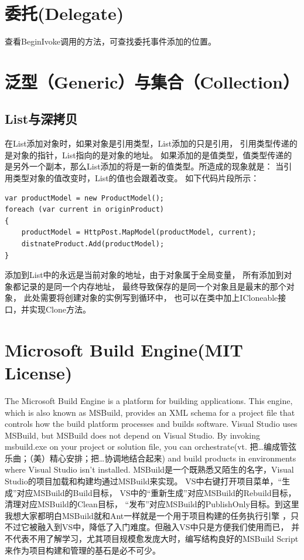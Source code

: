 \documentclass{book}
\begin{document}
\section{委托(Delegate)}

查看BeginIvoke调用的方法，可查找委托事件添加的位置。

\section{泛型（Generic）与集合（Collection）}

\subsection{List与深拷贝}

在List添加对象时，如果对象是引用类型，List添加的只是引用，
引用类型传递的是对象的指针，List指向的是对象的地址。
如果添加的是值类型，值类型传递的是另外一个副本，那么List添加的将是一新的值类型。所造成的现象就是：
当引用类型对象的值改变时，List的值也会跟着改变。
如下代码片段所示：

\begin{lstlisting}[language={[Sharp]C},caption=List添加对象引用示例]
var productModel = new ProductModel();
foreach (var current in originProduct)
{    
    productModel = HttpPost.MapModel(productModel, current);
    distnateProduct.Add(productModel);
}
\end{lstlisting}

添加到List中的永远是当前对象的地址，由于对象属于全局变量，
所有添加到对象都记录的是同一个内存地址，
最终导致保存的是同一个对象且是最末的那个对象，
此处需要将创建对象的实例写到循环中，
也可以在类中加上ICloneable接口，并实现Clone方法。

\section{Microsoft Build Engine(MIT License)}

The Microsoft Build Engine is a platform for building applications. 
This engine, which is also known as MSBuild, 
provides an XML schema for a project file that controls how 
the build platform processes and builds software. 
Visual Studio uses MSBuild, but MSBuild does not depend on Visual Studio. 
By invoking msbuild.exe on your project or solution file, 
you can orchestrate(vt. 把…编成管弦乐曲；（美）精心安排；把…协调地结合起来) and build products in environments where Visual Studio isn't installed.
MSBuild是一个既熟悉又陌生的名字，Visual Studio的项目加载和构建均通过MSBuild来实现。
VS中右键打开项目菜单，“生成”对应MSBuild的Build目标，
VS中的“重新生成”对应MSBuild的Rebuild目标，清理对应MSBuild的Clean目标，
“发布”对应MSBuild的PublishOnly目标。到这里我想大家都明白MSBuild就和Ant一样就是一个用于项目构建的任务执行引擎
，只不过它被融入到VS中，降低了入门难度。但融入VS中只是方便我们使用而已，
并不代表不用了解学习，尤其项目规模愈发庞大时，编写结构良好的MSBuild Script来作为项目构建和管理的基石是必不可少。
\end{document}
